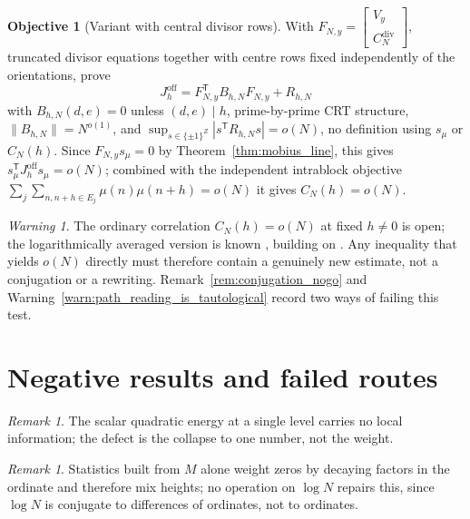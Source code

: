 \documentclass[11pt]{amsart}
\numberwithin{equation}{section}
\theoremstyle{plain}
\theoremstyle{definition}
\newtheorem{objective}[theorem]{Objective}
\theoremstyle{remark}
\newtheorem{remark}[theorem]{Remark}
\newtheorem{warning}[theorem]{Warning}
\begin{document}
\begin{objective}[Variant with central divisor rows]
\label{obj:central_rows}
With
$F_{N,y}=\begin{bmatrix}V_y\\ C_N^{\mathrm{div}}\end{bmatrix}$,
truncated divisor equations together with centre rows fixed
independently of the orientations, prove
\begin{equation}
J_h^{\mathrm{off}}=F_{N,y}^{\mathsf T}B_{h,N}F_{N,y}+R_{h,N}
\label{eq:obj_central}
\end{equation}
with $B_{h,N}(d,e)=0$ unless $(d,e)\mid h$, prime-by-prime CRT
structure, $\|B_{h,N}\|=N^{o(1)}$, and
$\sup_{s\in\{\pm1\}^Z}|s^{\mathsf T}R_{h,N}s|=o(N)$, no definition using
$s_\mu$ or $C_N(h)$. Since $F_{N,y}s_\mu=0$ by
Theorem~\ref{thm:mobius_line}, this gives
$s_\mu^{\mathsf T}J_h^{\mathrm{off}}s_\mu=o(N)$; combined with the
independent intrablock objective
$\sum_j\sum_{n,n+h\in E_j}\mu(n)\mu(n+h)=o(N)$ it gives $C_N(h)=o(N)$.
\end{objective}

\begin{warning}
\label{warn:new_estimate_required}
The ordinary correlation $C_N(h)=o(N)$ at fixed $h\ne0$ is open; the
logarithmically averaged version is known \cite{Tao2016}, building on
\cite{MatomakiRadziwill2016}. Any inequality that yields $o(N)$
directly must therefore contain a genuinely new estimate, not a
conjugation or a rewriting. Remark~\ref{rem:conjugation_nogo} and
Warning~\ref{warn:path_reading_is_tautological} record two ways of
failing this test.
\end{warning}

\section{Negative results and failed routes}
\label{sec:negative_results}

\begin{remark}
\label{rem:negative_result_energy_scalar}
The scalar quadratic energy at a single level carries no local
information; the defect is the collapse to one number, not the weight.
\end{remark}

\begin{remark}
\label{rem:negative_result_height_weighting}
Statistics built from $M$ alone weight zeros by decaying factors in the
ordinate and therefore mix heights; no operation on $\log N$ repairs
this, since $\log N$ is conjugate to differences of ordinates, not to
ordinates.
\end{remark}
\end{document}
